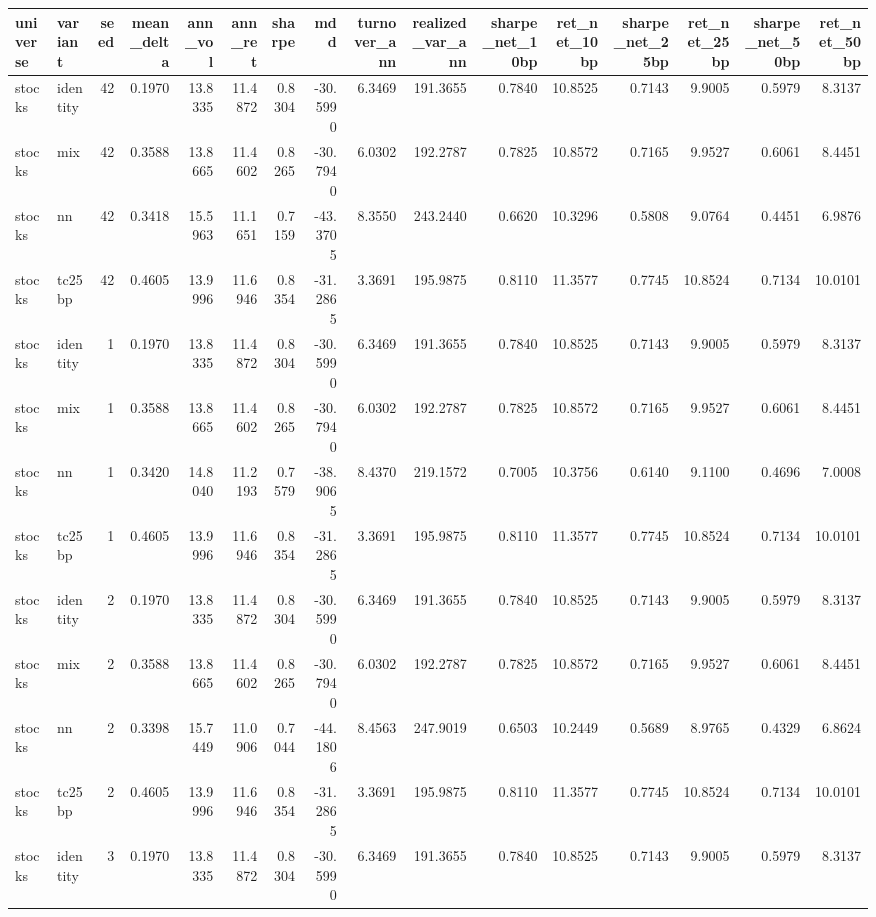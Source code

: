 \begin{tabular}{llrrrrrrrrrrrrrr}
\toprule
universe & variant & seed & mean_delta & ann_vol & ann_ret & sharpe & mdd & turnover_ann & realized_var_ann & sharpe_net_10bp & ret_net_10bp & sharpe_net_25bp & ret_net_25bp & sharpe_net_50bp & ret_net_50bp \\
\midrule
stocks & identity & 42 & 0.1970 & 13.8335 & 11.4872 & 0.8304 & -30.5990 & 6.3469 & 191.3655 & 0.7840 & 10.8525 & 0.7143 & 9.9005 & 0.5979 & 8.3137 \\
stocks & mix & 42 & 0.3588 & 13.8665 & 11.4602 & 0.8265 & -30.7940 & 6.0302 & 192.2787 & 0.7825 & 10.8572 & 0.7165 & 9.9527 & 0.6061 & 8.4451 \\
stocks & nn & 42 & 0.3418 & 15.5963 & 11.1651 & 0.7159 & -43.3705 & 8.3550 & 243.2440 & 0.6620 & 10.3296 & 0.5808 & 9.0764 & 0.4451 & 6.9876 \\
stocks & tc25bp & 42 & 0.4605 & 13.9996 & 11.6946 & 0.8354 & -31.2865 & 3.3691 & 195.9875 & 0.8110 & 11.3577 & 0.7745 & 10.8524 & 0.7134 & 10.0101 \\
stocks & identity & 1 & 0.1970 & 13.8335 & 11.4872 & 0.8304 & -30.5990 & 6.3469 & 191.3655 & 0.7840 & 10.8525 & 0.7143 & 9.9005 & 0.5979 & 8.3137 \\
stocks & mix & 1 & 0.3588 & 13.8665 & 11.4602 & 0.8265 & -30.7940 & 6.0302 & 192.2787 & 0.7825 & 10.8572 & 0.7165 & 9.9527 & 0.6061 & 8.4451 \\
stocks & nn & 1 & 0.3420 & 14.8040 & 11.2193 & 0.7579 & -38.9065 & 8.4370 & 219.1572 & 0.7005 & 10.3756 & 0.6140 & 9.1100 & 0.4696 & 7.0008 \\
stocks & tc25bp & 1 & 0.4605 & 13.9996 & 11.6946 & 0.8354 & -31.2865 & 3.3691 & 195.9875 & 0.8110 & 11.3577 & 0.7745 & 10.8524 & 0.7134 & 10.0101 \\
stocks & identity & 2 & 0.1970 & 13.8335 & 11.4872 & 0.8304 & -30.5990 & 6.3469 & 191.3655 & 0.7840 & 10.8525 & 0.7143 & 9.9005 & 0.5979 & 8.3137 \\
stocks & mix & 2 & 0.3588 & 13.8665 & 11.4602 & 0.8265 & -30.7940 & 6.0302 & 192.2787 & 0.7825 & 10.8572 & 0.7165 & 9.9527 & 0.6061 & 8.4451 \\
stocks & nn & 2 & 0.3398 & 15.7449 & 11.0906 & 0.7044 & -44.1806 & 8.4563 & 247.9019 & 0.6503 & 10.2449 & 0.5689 & 8.9765 & 0.4329 & 6.8624 \\
stocks & tc25bp & 2 & 0.4605 & 13.9996 & 11.6946 & 0.8354 & -31.2865 & 3.3691 & 195.9875 & 0.8110 & 11.3577 & 0.7745 & 10.8524 & 0.7134 & 10.0101 \\
stocks & identity & 3 & 0.1970 & 13.8335 & 11.4872 & 0.8304 & -30.5990 & 6.3469 & 191.3655 & 0.7840 & 10.8525 & 0.7143 & 9.9005 & 0.5979 & 8.3137 \\

\end{tabular}
